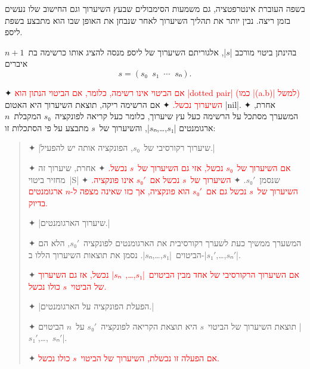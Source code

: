 בשפה העוברת אינטרפטציה, גם משמעות הסימבולים שבעץ השיערוך וגם החישוב שלו נעשים
בזמן ריצה. נבין יותר את תהליך השיערוך לאחר שנבחן את האופן שבו הוא מתבצע בשפת
ליספ.

\begin{minipage}{0.9\textwidth}
  \centering
\newcommand\exception[1]{{\textcolor{red}{#1}}}
\begin{mdframed}[backgroundcolor=Lavender!20]
  \footnotesize
  בהינתן ביטוי מורכב \E|$s$|, אלגוריתם השיערוך של ליספ מנסה
  להציג אותו כרשימה בת~$n+1$ איברים \[
    s=(s₀\;\;s₁\;\;⋯\;\;sₙ).
\] \begin{enumerate}
    ✦ \exception{
      אם הביטוי אינו רשימה, כלומר, אם הביטוי הנתון הוא \E|dotted pair| (כמו
      \E|(a.b)| למשל) השיערוך נכשל.}
    ✦ אם הרשימה ריקה, תוצאת השיערוך היא האטום \T|nil|.
    ✦ אחרת, המשערך מסתכל על הרשימה כעל עץ שיערוך, כלומר כעל קריאה
    לפונקציה~$s₀$ המקבלת~$n$ ארגומנטים \E|$s₁$,…,$sₙ$|, והשיערוך של~$s$ מתבצע
    על פי הסתכלות זו:
    \begin{quote}
      \begin{enumerate}
        ✦ \ע|שיערוך רקורסיבי של~$s₀$, הפונקציה אותה יש להפעיל.|
        \begin{itemize}
          ✦ \exception{אם השיערוך של~$s₀$ נכשל, אזי גם השיערוך של~$s$ נכשל.}
          ✦ אחרת, שיערוך זה מחזיר ביטוי~\E|S| שנסמן~$s₀'$.
          ✦ \exception{השיערוך של~$s$ נכשל אם~$s₀'$ אינו פונקציה.}
          ✦ \exception{השיערוך של~$s$ נכשל גם אם~$s₀'$ הוא פונקציה, אך כזו
            שאינה מצפה ל-$n$ ארגומנטים בדיוק.}
        \end{itemize}
        ✦ \ע|שיערוך הארגומנטים.|
        \begin{itemize}
          ✦ המשערך ממשיך כעת לשערך רקורסיבית את הארגומנטים לפונקציה~$s₀'$,
          הלא הם הביטוים~\E|$s₁$,…,$sₙ$|. נסמן את תוצאות השיערוך הללו
          ב-\E|$s₁'$,…,$sₙ'$|.

          ✦ \exception{אם השיערוך הרקורסיבי של אחד מבין
            הביטוים~\E|$s₁$,…,~$sₙ$| נכשל, אז גם השיערוך של הביטוי~$s$ כולו
            נכשל.}
        \end{itemize}

        ✦ \ע|הפעלת הפונקציה על הארגומנטים.|

        \begin{itemize}
          ✦ תוצאת השיערוך של הביטוי~$s$ היא תוצאת הקריאה לפונקציה~$s₀'$
          על~$n$ הביטוים \E|$s₁'$,…,~$sₙ'$|.

          ✦ \exception{אם הפעלה זו נכשלת, השיערוך של הביטוי~$s$ כולו נכשל.}
        \end{itemize}
      \end{enumerate}
    \end{quote}
  \end{enumerate}
\end{mdframed}
\end{minipage}


